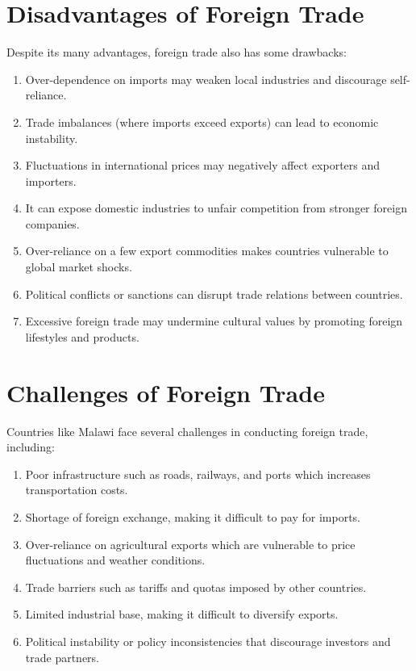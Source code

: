 \documentclass[12pt,a4paper, openany]{book}
\begin{document}
\section{Disadvantages of Foreign Trade}
Despite its many advantages, foreign trade also has some drawbacks:

\begin{enumerate}
	\item Over-dependence on imports may weaken local industries and discourage self-reliance.
	\item Trade imbalances (where imports exceed exports) can lead to economic instability.
	\item Fluctuations in international prices may negatively affect exporters and importers.
	\item It can expose domestic industries to unfair competition from stronger foreign companies.
	\item Over-reliance on a few export commodities makes countries vulnerable to global market shocks.
	\item Political conflicts or sanctions can disrupt trade relations between countries.
	\item Excessive foreign trade may undermine cultural values by promoting foreign lifestyles and products.
\end{enumerate}
\section{Challenges of Foreign Trade}
Countries like Malawi face several challenges in conducting foreign trade, including:

\begin{enumerate}
	\item Poor infrastructure such as roads, railways, and ports which increases transportation costs.
	\item Shortage of foreign exchange, making it difficult to pay for imports.
	\item Over-reliance on agricultural exports which are vulnerable to price fluctuations and weather conditions.
	\item Trade barriers such as tariffs and quotas imposed by other countries.
	\item Limited industrial base, making it difficult to diversify exports.
	\item Political instability or policy inconsistencies that discourage investors and trade partners.
\end{enumerate}
\end{document}
